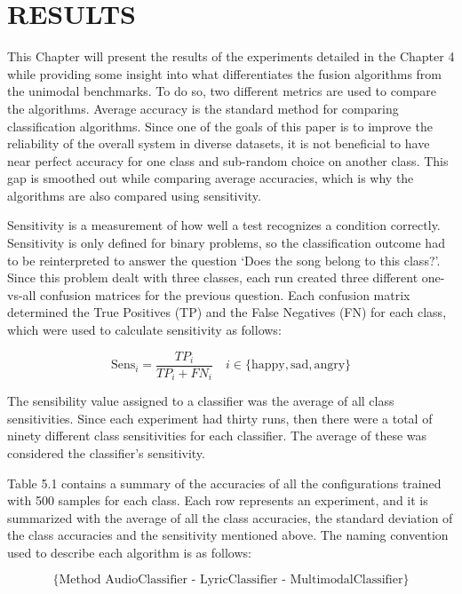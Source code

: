 \renewcommand{\chaptername}{}

\chapter{RESULTS}
 
This Chapter will present the results of the experiments detailed in the Chapter 4 while providing 
some insight into what differentiates the fusion algorithms from the unimodal benchmarks. To do 
so, two different metrics are used to compare the algorithms. Average accuracy is the standard 
method for comparing classification algorithms. Since one of the goals of this paper is to improve 
the reliability of the overall system in diverse datasets, it is not beneficial to have near perfect 
accuracy for one class and sub-random choice on another class. This gap is smoothed out while 
comparing average accuracies, which is why the algorithms are also compared using  sensitivity.

Sensitivity is a measurement of how well a test recognizes a condition correctly. Sensitivity is only defined 
for binary problems, so the classification outcome had to be reinterpreted to answer the question \lq Does the song belong to this class?'. Since this problem
dealt with three classes, each run created three different one-vs-all confusion matrices for the previous question. Each confusion matrix determined the True Positives (TP) and the False Negatives (FN) for each class, which were used to calculate sensitivity as follows:

\begin{equation}
\text{Sens}_{i} = \frac{TP_i}{TP_i +FN_i} \quad i \in \{\text{happy}, \text{sad}, \text{angry}\}
\end{equation}

The sensibility value assigned to a classifier was the average of all class sensitivities. Since each experiment had thirty runs, then there were a total of ninety different class sensitivities for each classifier. The average of these was considered the classifier's sensitivity.

Table 5.1 contains a summary of the accuracies of all the configurations trained with 500 samples 
for each class. Each row represents an experiment, and it is summarized with the average of all the class accuracies,
 the standard deviation of the class accuracies and the sensitivity mentioned above.  The naming convention used
 to describe each algorithm is as follows: 
 
 \[ \{\text{Method  AudioClassifier - LyricClassifier - MultimodalClassifier}\}  \]  
 

